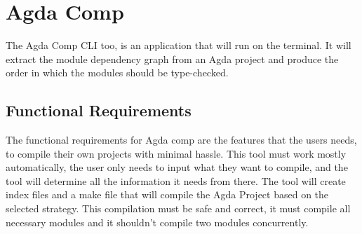 \section{Agda Comp}

The Agda Comp CLI too, is an application that will run on the terminal. It will
extract the module dependency graph from an Agda project and produce the order
in which the modules should be type-checked.

\subsection{Functional Requirements}

\begin{minipage}{\linewidth}

The functional requirements for Agda comp are the features that the users
needs, to compile their own projects with minimal hassle. This tool must work
mostly automatically, the user only needs to input what they want to compile, and the tool will determine all the information it needs from there. The tool
will create index files and a make file that will compile the Agda Project
based on the selected strategy. This compilation must be safe and correct, it
must compile all necessary modules and it shouldn't compile two modules
concurrently.


\end{minipage}
